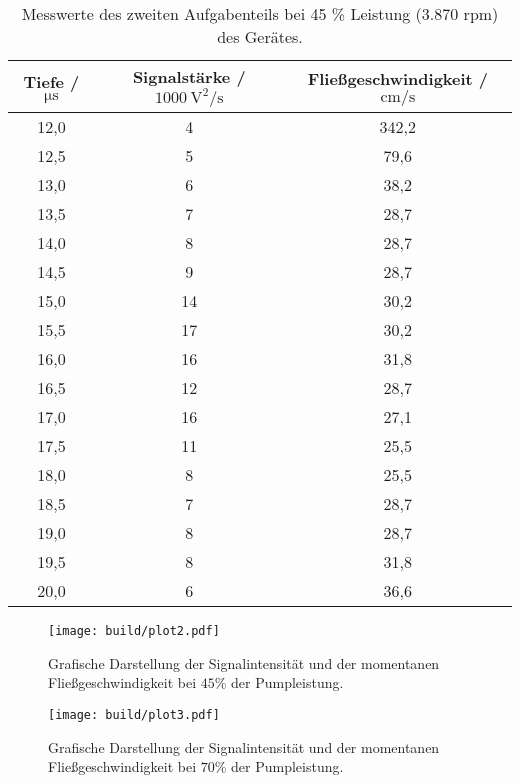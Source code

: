 \begin{table}[H]
  \centering
  \caption{Messwerte des zweiten Aufgabenteils bei 45 \% Leistung (3.870 rpm) des Gerätes.}
  \label{tab:Werte2}
  \begin{tabular}{c c c}
    \toprule
    Tiefe / $\si{\micro\second}$ & Signalstärke / $\SI{1000}{\square\volt\per\second}$ & Fließgeschwindigkeit / $\si{\centi\meter\per\second}$ \\
    \midrule
    12,0 & 4 & 342,2 \\
    12,5 & 5 & 79,6 \\
    13,0 & 6 & 38,2 \\
    13,5 & 7 & 28,7 \\
    14,0 & 8 & 28,7 \\
    14,5 & 9 & 28,7 \\
    15,0 & 14 & 30,2 \\
    15,5 & 17 & 30,2 \\
    16,0 & 16 & 31,8 \\
    16,5 & 12 & 28,7 \\
    17,0 & 16 & 27,1 \\
    17,5 & 11 & 25,5 \\
    18,0 & 8 & 25,5 \\
    18,5 & 7 & 28,7 \\
    19,0 & 8 & 28,7 \\
    19,5 & 8 & 31,8 \\
    20,0 & 6 & 36,6 \\
    \bottomrule
  \end{tabular}
\end{table}

\begin{figure}[H]
  \centering
  \texttt{[image: build/plot2.pdf]}
  \caption{Grafische Darstellung der Signalintensität und der momentanen Fließgeschwindigkeit bei $45\%$ der Pumpleistung.}
  \label{fig:plot2}
\end{figure}

\begin{figure}[H]
  \centering
  \texttt{[image: build/plot3.pdf]}
  \caption{Grafische Darstellung der Signalintensität und der momentanen Fließgeschwindigkeit bei $70\%$ der Pumpleistung.}
  \label{fig:plot3}
\end{figure}